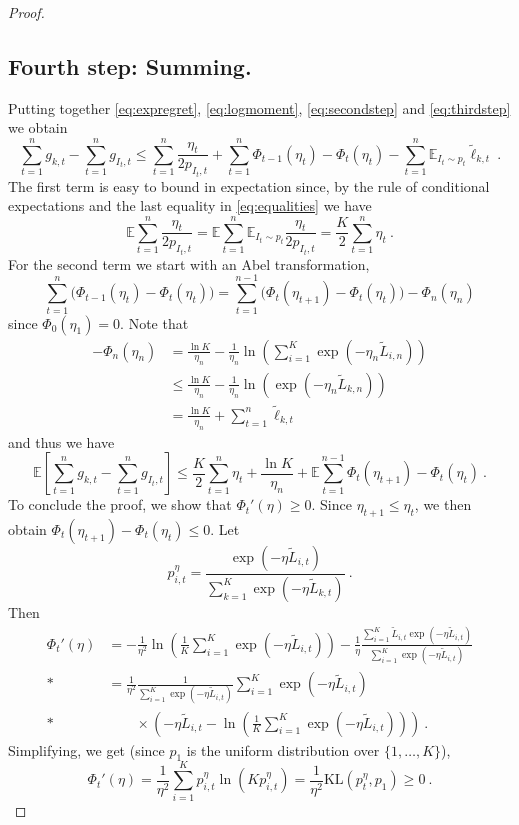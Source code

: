 \documentclass[11pt]{hackednow}
\newcommand{\K}{\mathrm{KL}}
\newcommand{\E}{\mathbb{E}}
\renewcommand{\tilde}{\widetilde}
\begin{document}
\begin{proof}
\subsection*{Fourth step: Summing.}
Putting together \eqref{eq:expregret}, \eqref{eq:logmoment}, \eqref{eq:secondstep} and \eqref{eq:thirdstep} we obtain
$$\sum_{t=1}^n g_{k,t} - \sum_{t=1}^n g_{I_t,t} \leq \sum_{t=1}^n \frac{\eta_t}{2 p_{I_t,t}} + \sum_{t=1}^n \Phi_{t-1}(\eta_t) - \Phi_t(\eta_t) - \sum_{t=1}^n \E_{I_t \sim p_t} \tilde{\ell}_{k,t}~.$$
The first term is easy to bound in expectation since, by the rule of conditional expectations and the last equality in \eqref{eq:equalities} we have
$$\E \sum_{t=1}^n \frac{\eta_t}{2 p_{I_t,t}} = \E \sum_{t=1}^n \E_{I_t \sim p_t} \frac{\eta_t}{2 p_{I_t,t}} = \frac{K}{2} \sum_{t=1}^n \eta_t~.$$
For the second term we start with an Abel transformation,
$$\sum_{t=1}^n \bigl(\Phi_{t-1}(\eta_t) - \Phi_t(\eta_t)\bigr) = \sum_{t=1}^{n-1} \bigl(\Phi_t(\eta_{t+1}) - \Phi_t(\eta_t)\bigr) - \Phi_n(\eta_n)$$
since $\Phi_0(\eta_1)=0$. Note that
\begin{align*}
- \Phi_n(\eta_n) & = \frac{\ln K}{\eta_n} - \frac{1}{\eta_n} \ln\left(\sum_{i=1}^K \exp\left(-\eta_n \tilde{L}_{i,n}\right)\right) \\ & \leq \frac{\ln K}{\eta_n} - \frac{1}{\eta_n} \ln\left(\exp\left(-\eta_n \tilde{L}_{k,n}\right)\right)\\
& =  \frac{\ln K}{\eta_n} + \sum_{t=1}^n \tilde{\ell}_{k,t}
\end{align*}
and thus we have
$$\E \left[ \sum_{t=1}^n g_{k,t} - \sum_{t=1}^n g_{I_t,t} \right] \leq \frac{K}{2} \sum_{t=1}^n \eta_t + \frac{\ln K}{\eta_n} + \E \sum_{t=1}^{n-1} \Phi_t(\eta_{t+1}) - \Phi_t(\eta_t)~.$$
To conclude the proof, we show that $\Phi_t'(\eta)\geq 0$. Since $\eta_{t+1}\leq \eta_t$, we then obtain $\Phi_t(\eta_{t+1}) - \Phi_t(\eta_t) \leq 0$. 
Let
\[
    p_{i,t}^{\eta}=\frac{\exp{\left(- \eta \tilde{L}_{i,t}\right)}}{\sum_{k=1}^K \exp{\left(- \eta \tilde{L}_{k,t}\right)}}~.
\]
Then
\begin{align*}
\Phi_t'(\eta) & = - \frac{1}{\eta^2} \ln\left(\frac{1}{K} \sum_{i=1}^K \exp{\left(- \eta \tilde{L}_{i,t}\right)}\right) - \frac{1}{\eta}\frac{\sum_{i=1}^K \tilde{L}_{i,t} \exp{\left(- \eta \tilde{L}_{i,t}\right)}}{\sum_{i=1}^K \exp{\left(- \eta \tilde{L}_{i,t}\right)}} \\*
& = \frac{1}{\eta^2} \frac{1}{\sum_{i=1}^K \exp{\left(- \eta \tilde{L}_{i,t}\right)}} \sum_{i=1}^K \exp{\left(- \eta \tilde{L}_{i,t}\right)} \\*
& \qquad \times \left(-\eta \tilde{L}_{i,t} - \ln\left(\frac{1}{K} \sum_{i=1}^K \exp{\left(- \eta \tilde{L}_{i,t}\right)}\right) \right)~.
\end{align*}
Simplifying, we get (since $p_1$ is the uniform distribution over $\{1,\hdots,K\}$),
\[
\Phi_t'(\eta) = \frac{1}{\eta^2} \sum_{i=1}^K p_{i,t}^{\eta} \ln(K p_{i,t}^{\eta}) = \frac{1}{\eta^2} \K(p_t^{\eta}, p_1) \geq 0~.
\]
\end{proof}
\end{document}
